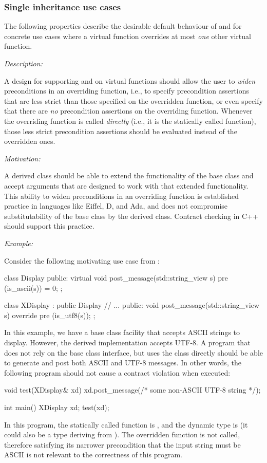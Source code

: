 \subsubsection{Single inheritance use cases}

The following properties describe the desirable default behaviour of  and  for concrete use cases where a virtual function overrides at most \emph{one} other virtual function.


\emph{Description:}

A design for supporting  and  on virtual functions should allow the user to \emph{widen} preconditions in an overriding function, i.e., to specify precondition assertions that are less strict than those specified on the overridden function, or even specify that there are \emph{no} precondition assertions on the overriding function. Whenever the overriding function is called \emph{directly} (i.e., it is the statically called function), those less strict precondition assertions should be evaluated instead of the overridden ones.

\emph{Motivation:}

A derived class should be able to extend the functionality of the base class and accept arguments that are designed to work with that extended functionality. This ability to widen preconditions in an overriding function is established practice in languages like Eiffel, D, and Ada, and does not compromise substitutability of the base class by the derived class. Contract checking in C++ should support this practice.

\emph{Example:}

Consider the following motivating use case from \cite{P0247R0}:
\begin{codeblock}
class Display {
public:
  virtual void post_message(std::string_view s)
     pre (is_ascii(s)) = 0;
};

class XDisplay : public Display {
   // ...
public:
  void post_message(std::string_view s) override
    pre (is_utf8(s));
 };
\end{codeblock}
In this example, we have a base class facility that accepts ASCII strings to display. However, the derived implementation accepts UTF-8. A program that does not rely on the  base class interface, but uses the  class directly should be able to generate and post both ASCII and UTF-8 messages. In other words, the following program should not cause a contract violation when executed:
\begin{codeblock}
void test(XDisplay& xd) {
  xd.post_message(/* some non-ASCII UTF-8 string */);
}

int main() {
  XDisplay xd;
  test(xd);
}
\end{codeblock}
In this program, the statically called function is , and the dynamic type is  (it could also be a type deriving from ). The overridden function  is not called, therefore satisfying its narrower precondition that the input string must be ASCII is not relevant to the correctness of this program.

